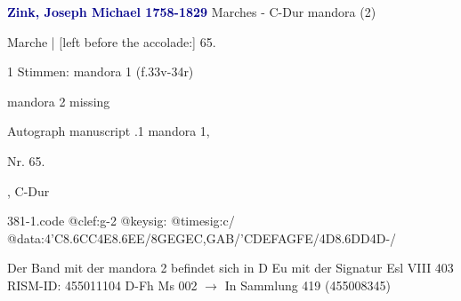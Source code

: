\documentclass[twocolumn]{book}
\begin{document}
\newline \par \vspace{7pt} \textcolor{darkblue}{\textbf{Zink, Joseph Michael  1758-1829}}
\newline Marches - C-Dur
\newline mandora (2)
\newline \begin{itshape}[f.33v, at left:] Marche | [left before the accolade:] 65.\end{itshape} 
\newline \textcolor{darkblue}{}  1 Stimmen: mandora 1  (f.33v-34r)
\newline \begin{small} mandora 2 missing\end{small} 
\newline Autograph manuscript
.1  mandora 1, \begin{itshape}Nr. 65.\end{itshape}, C-Dur  
\begin{filecontents*}{381-1.code}
@clef:g-2
@keysig:
@timesig:c/
@data:4'C{8.6CC}4E{8.6EE}/{8GEGE}{C,GAB}/{'CDEF}{AGFE}/4D{8.6DD}4D-/
\end{filecontents*}
\newline
%
\newline Der Band mit der mandora 2 befindet sich in D Eu mit der Signatur Esl VIII 403
\newline RISM-ID: 455011104
\newline D-Fh  Ms 002
\newline $\rightarrow$ In Sammlung 419 (455008345)
      
\end{document}
